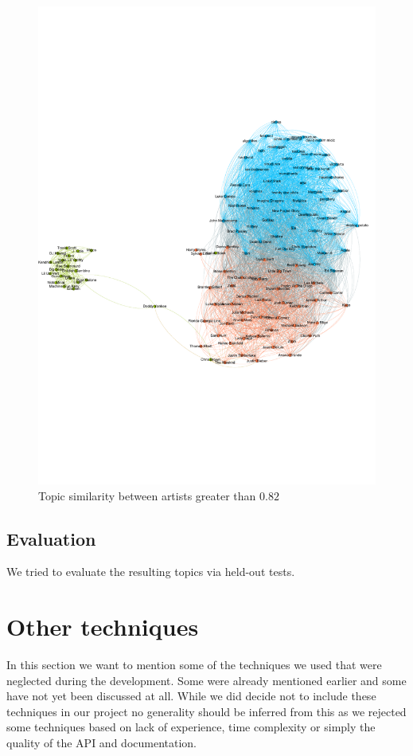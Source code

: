 \documentclass[10pt,a4paper]{article}
\begin{document}
		\begin{figure}[htb]
			\centering
			\includegraphics[trim=0mm 70mm 0mm 50mm, clip, width=\linewidth]{data/topic_similarity}
				\caption{Topic similarity between artists greater than $0.82$}
				\label{fig:topicsimilarity}
		\end{figure}
		
		\subsection{Evaluation}
		We tried to evaluate the resulting topics via held-out tests.
	
	\section{Other techniques}
	\label{sec:othertechniques}
	In this section we want to mention some of the techniques we used that were neglected during the development. Some were already mentioned earlier and some have not yet been discussed at all. While we did decide not to include these techniques in our project no generality should be inferred from this as we rejected some techniques based on lack of experience, time complexity or simply the quality of the API and documentation.
	
\end{document}

